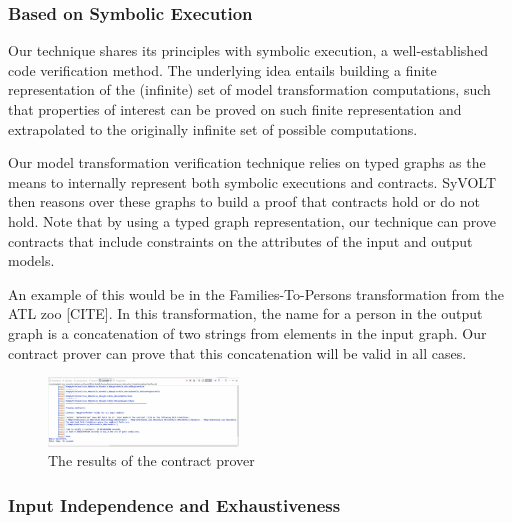 \subsubsection{Based on Symbolic Execution}

Our technique shares its principles with
symbolic execution, a well-established code verification method.
The underlying idea entails building a finite representation of the (infinite)
set of model transformation computations, such that properties of interest can
be proved on
such finite representation and extrapolated to the originally infinite set of possible
computations.

Our model transformation verification technique relies on typed graphs as the
means to internally represent both symbolic executions and contracts. SyVOLT
then reasons over these graphs to build a proof that contracts hold or do not
hold. Note that by using a typed graph representation, our technique can prove
contracts that include constraints on the attributes of the input and output
models. 

 An example of this
would be in the Families-To-Persons transformation from the ATL zoo [CITE]. In
this transformation, the name for a person in the output graph is a
concatenation of two strings  from elements in the input
graph. Our contract prover can prove that this concatenation will be valid in
all cases.

\begin{figure}
\centering
\includegraphics[width=0.45\textwidth]{figures/syvolt_prover/output}
\caption{The results of the contract prover}
\label{fig:output}
\end{figure}

\subsubsection{Input Independence and Exhaustiveness} 

